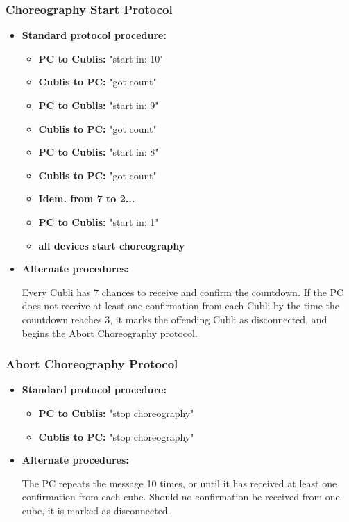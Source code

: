 \subsubsection{Choreography Start Protocol}

\begin{itemize}
\item[] \textbf{Standard protocol procedure:}

\begin{itemize}
\item[] \textbf{PC to Cublis:} "start in: 10"
\item[] \textbf{Cublis to PC:} "got count"
\item[] \textbf{PC to Cublis:} "start in:  9"
\item[] \textbf{Cublis to PC:} "got count"
\item[] \textbf{PC to Cublis:} "start in:  8"
\item[] \textbf{Cublis to PC:} "got count"
\item[] \textbf{Idem. from 7 to 2...}
\item[] \textbf{PC to Cublis:} "start in:  1"
\item[] \textbf{all devices start choreography}
\end{itemize}

\item[] \textbf{Alternate procedures:}

Every Cubli has 7 chances to receive and confirm the countdown. If the PC does not receive at least one confirmation from each Cubli by the time the countdown reaches 3, it marks the offending Cubli as disconnected, and begins the Abort Choreography protocol.

\end{itemize}

\subsubsection{Abort Choreography Protocol}

\begin{itemize}
\item[] \textbf{Standard protocol procedure:}

\begin{itemize}
\item[] \textbf{PC to Cublis:} "stop choreography"
\item[] \textbf{Cublis to PC:} "stop choreography"
\end{itemize}

\item[] \textbf{Alternate procedures:}

The PC repeats the message 10 times, or until it has received at least one confirmation from each cube. Should no confirmation be received from one cube, it is marked as disconnected.

\end{itemize}

